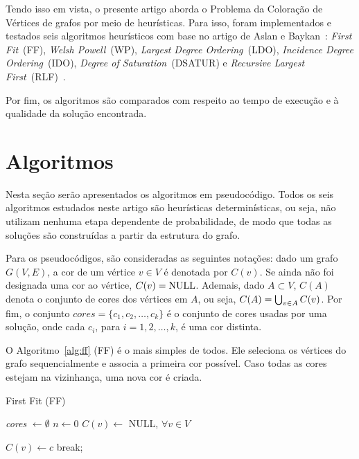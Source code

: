 \documentclass[10pt, twocolumn]{article}
\begin{document}
Tendo isso em vista, o presente artigo aborda o Problema da Coloração de Vértices
de grafos por meio de heurísticas.
Para isso, foram implementados e testados seis algoritmos heurísticos com base no artigo de
Aslan e Baykan~\cite{AsBa18}: \emph{First Fit}~(FF), \emph{Welsh Powell}~(WP),
\emph{Largest Degree Ordering}~(LDO), \emph{Incidence Degree Ordering}~(IDO),
\emph{Degree of Saturation}~(DSATUR) e \emph{Recursive Largest First}~(RLF)~\cite{AsBa18}.

Por fim, os algoritmos são comparados com respeito ao tempo de execução e à
qualidade da solução encontrada.


\section{Algoritmos}

Nesta seção serão apresentados os algoritmos em pseudocódigo.
Todos os seis algoritmos estudados neste artigo são heurísticas determinísticas,
ou seja, não utilizam nenhuma etapa dependente de probabilidade, de modo que
todas as soluções são construídas a partir da estrutura do grafo.

Para os pseudocódigos, são consideradas as seguintes notações:
dado um grafo $G(V,E)$, a cor de um vértice $v \in V$ é denotada por $C(v)$.
Se ainda não foi designada uma cor ao vértice, $C(v) = \textnormal{NULL}$.
Ademais, dado $A \subset V$, $C(A)$ denota o conjunto de cores dos vértices em $A$,
ou seja, $C(A)\nobreak=\nobreak\bigcup_{v \in A} C(v)$. Por fim, o conjunto
$cores = \{c_1, c_2, \dots, c_k\}$ é o conjunto de cores usadas por uma solução,
onde cada $c_i$, para $i = 1, 2, \dots, k$, é uma cor distinta.

O Algoritmo~\ref{alg:ff} (FF) é o mais simples de todos. Ele seleciona os vértices
do grafo sequencialmente e associa a primeira cor possível. Caso todas as cores
estejam na vizinhança, uma nova cor é criada.

\begin{algorithm}
\caption{First Fit (FF)}
\label{alg:ff}


\emph{cores} $\gets \emptyset$\;
$n \gets 0$\;
$C(v) \gets$ NULL, $\forall v \in V$\;

 {
     {
         {
            $C(v) \gets c$\;
            break;
        }
    }
}
\;

\end{algorithm}
\end{document}
